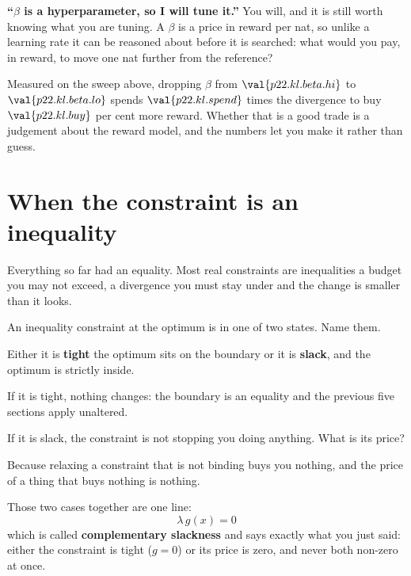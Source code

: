 \begin{fr}
\begin{trapbox}
\textbf{\enquote{$\beta$ is a hyperparameter, so I will tune it.}} You will,
and it is still worth knowing what you are tuning. A $\beta$ is a price in
reward per nat, so \dash{} unlike a learning rate \dash{} it can be reasoned
about before it is searched: what would you pay, in reward, to move one nat
further from the reference?

Measured on the sweep above, dropping $\beta$ from $\val{p22.kl.beta.hi}$ to
$\val{p22.kl.beta.lo}$ spends $\val{p22.kl.spend}$ times the divergence to buy
$\val{p22.kl.buy}$ per cent more reward. Whether that is a good trade is a
judgement about the reward model, and the numbers let you make it rather than
guess.
\end{trapbox}
\end{fr}

\section{When the constraint is an inequality}
\label{sec:P22-kkt}

\begin{fr}
Everything so far had an equality. Most real constraints are inequalities
\dash{} a budget you may not exceed, a divergence you must stay under \dash{}
and the change is smaller than it looks.

An inequality constraint at the optimum is in one of two states. Name them.
\dotline
\nextframe
\end{fr}

\begin{fr}
\begin{ansblock}
Either it is \textbf{tight} \dash{} the optimum sits on the boundary \dash{} or
it is \textbf{slack}, and the optimum is strictly inside.
\end{ansblock}

If it is tight, nothing changes: the boundary is an equality and the previous
five sections apply unaltered.

If it is slack, the constraint is not stopping you doing anything. What is its
price?
\nextframe
\end{fr}

\begin{fr}
Because relaxing a constraint that is not binding buys you nothing, and the
price of a thing that buys nothing is nothing.

Those two cases together are one line:
\[ \lambda \, g(x) = 0 \]
which is called \textbf{complementary slackness} and says exactly what you
just said: either the constraint is tight ($g = 0$) or its price is zero, and
never both non-zero at once.
\end{fr}

